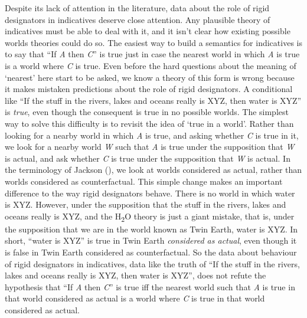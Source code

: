 \documentclass[
  10pt,
  letterpaper,
  DIV=11,
  numbers=noendperiod,
  twoside]{scrartcl}
\begin{document}
Despite its lack of attention in the literature, data about the role of
rigid designators in indicatives deserve close attention. Any plausible
theory of indicatives must be able to deal with it, and it isn't clear
how existing possible worlds theories could do so. The easiest way to
build a semantics for indicatives is to say that ``If \emph{A} then
\emph{C}'' is true just in case the nearest world in which \emph{A} is
true is a world where \emph{C} is true. Even before the hard questions
about the meaning of `nearest' here start to be asked, we know a theory
of this form is wrong because it makes mistaken predictions about the
role of rigid designators. A conditional like ``If the stuff in the
rivers, lakes and oceans really is XYZ, then water is XYZ'' is
\emph{true}, even though the consequent is true in no possible worlds.
The simplest way to solve this difficulty is to revisit the idea of
`true in a world'. Rather than looking for a nearby world in which
\emph{A} is true, and asking whether \emph{C} is true in it, we look for
a nearby world \emph{W} such that \emph{A} is true under the supposition
that \emph{W} is actual, and ask whether \emph{C} is true under the
supposition that \emph{W} is actual. In the terminology of Jackson
(), we look at worlds considered as
actual, rather than worlds considered as counterfactual. This simple
change makes an important difference to the way rigid designators
behave. There is no world in which water is XYZ. However, under the
supposition that the stuff in the rivers, lakes and oceans really is
XYZ, and the H\textsubscript{2}O theory is just a giant mistake, that
is, under the supposition that we are in the world known as Twin Earth,
water is XYZ. In short, ``water is XYZ'' is true in Twin Earth
\emph{considered as actual}, even though it is false in Twin Earth
considered as counterfactual. So the data about behaviour of rigid
designators in indicatives, data like the truth of ``If the stuff in the
rivers, lakes and oceans really is XYZ, then water is XYZ'', does not
refute the hypothesis that ``If \emph{A} then \emph{C}'' is true iff the
nearest world such that \emph{A} is true in that world considered as
actual is a world where \emph{C} is true in that world considered as
actual.
\end{document}
